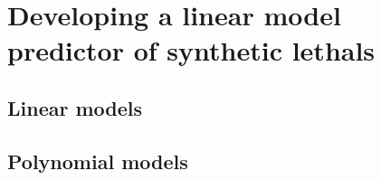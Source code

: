 \label{chapt5:compare_compute_time}
\fi


\iffalse
\begin{itemize}
 \item ChiSQ
 \item SLIPT
 \item Correlation
 \item BiSEp
 \item LM/GLM
\end{itemize}


\subsubsection{Testing Synthetic Lethal Genes with Linear Models}
\label{chapt5:compare_linear_model}
[Move to future Dir??]

\begin{itemize}
 \item Strategy to detect SL with linear models by fit to curve (significance) and slope (direction)
 \item Amenable to conditioning on known SL or iterative conditioning on strongest SL to detect other partners of higher-order SL
 \item All attempts: linear, GLM, and linear polynomial (quadratic, cubic, or quintic) underperform \gls{SLIPT}, similar to Pearson correlation results
 \item Linear models and regression may still be an avenue for further detection of SL (e.g., with Bayes)
\end{itemize}
\fi



\iffalse
\section{Developing a linear model predictor of \glspl{synthetic lethal}}
\subsection{Linear models}
\subsection{Polynomial models}
